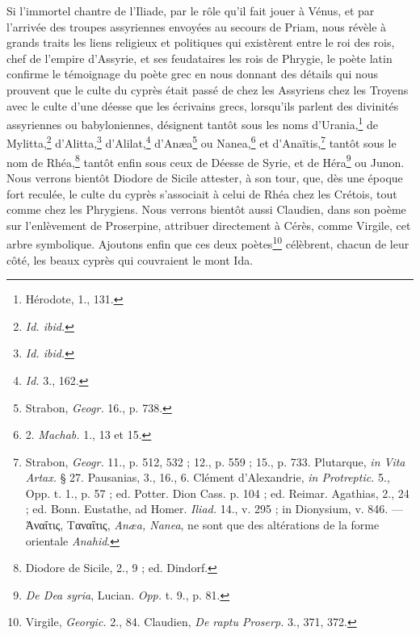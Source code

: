 \documentclass{article}
\begin{document}
Si l'immortel chantre de l'Iliade, par le rôle qu'il fait jouer à Vénus, et par l'arrivée des troupes assyriennes envoyées au secours de Priam, nous révèle à grands traits les liens religieux et politiques qui existèrent entre le roi des rois, chef de l'empire d'Assyrie, et ses feudataires les rois de Phrygie, le poète latin confirme le témoignage du poète grec en nous donnant des détails qui nous prouvent que le culte du cyprès était passé de chez les Assyriens chez les Troyens avec le culte d'une déesse que les écrivains grecs, lorsqu'ils parlent des divinités assyriennes ou babyloniennes, désignent tantôt sous les noms d'Urania,\footnote{Hérodote, 1., 131.} de Mylitta,\footnote{\emph{Id. ibid.}} d'Alitta,\footnote{\emph{Id. ibid.}} d'Alilat,\footnote{\emph{Id.} 3., 162.} d'Anæa\footnote{Strabon, \emph{Geogr.} 16., p. 738.} ou Nanea,\footnote{2. \emph{Machab.} 1., 13 et 15.} et d'Anaïtis,\footnote{Strabon, \emph{Geogr.} 11., p. 512, 532 ; 12., p. 559 ; 15., p. 733. Plutarque, \emph{in Vita Artax.} § 27. Pausanias, 3., 16., 6. Clément d'Alexandrie, \emph{in Protreptic.} 5., Opp. t. 1., p. 57 ; ed. Potter. Dion Cass. p. 104 ; ed. Reimar. Agathias, 2., 24 ; ed. Bonn. Eustathe, ad Homer. \emph{Iliad.} 14., v. 295 ; in Dionysium, v. 846. --- \textgreek{Ἀναΐτις, Ταναΐτις}, \emph{Anæa, Nanea}, ne sont que des altérations de la forme orientale \emph{Anahid}.} tantôt sous le nom de Rhéa,\footnote{Diodore de Sicile, 2., 9 ; ed. Dindorf.} tantôt enfin sous ceux de Déesse de Syrie, et de Héra\footnote{\emph{De Dea syria}, Lucian. \emph{Opp.} t. 9., p. 81.} ou Junon. Nous verrons bientôt Diodore de Sicile attester, à son tour, que, dès une époque fort reculée, le culte du cyprès s'associait à celui de Rhéa chez les Crétois, tout comme chez les Phrygiens. Nous verrons bientôt aussi Claudien, dans son poème sur l'enlèvement de Proserpine, attribuer directement à Cérès, comme Virgile, cet arbre symbolique. Ajoutons enfin que ces deux poètes\footnote{Virgile, \emph{Georgic.} 2., 84. Claudien, \emph{De raptu Proserp.} 3., 371, 372.} célèbrent, chacun de leur côté, les beaux cyprès qui couvraient le mont Ida.
\end{document}
